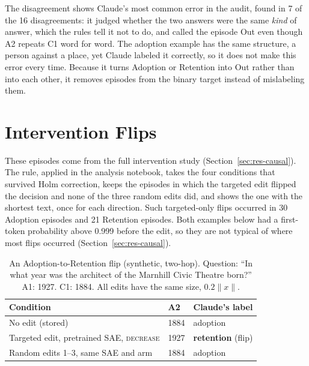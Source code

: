 The disagreement shows Claude's most common error in the audit, found in 7 of
the 16 disagreements: it judged whether the two answers were the same
\emph{kind} of answer, which the rules tell it not to do, and called the
episode Out even though A2 repeats C1 word for word. The adoption example has
the same structure, a person against a place, yet Claude labeled it
correctly, so it does not make this error every time. Because it
turns Adoption or Retention into Out rather than into each other, it removes
episodes from the binary target instead of mislabeling them.

\section{Intervention Flips}

These episodes come from the full intervention study (Section~\ref{sec:res-causal}).
The rule, applied in the analysis notebook, takes the four conditions that
survived Holm correction, keeps the episodes in which the targeted edit
flipped the decision and none of the three random edits did, and shows the
one with the shortest text, once for each direction. Such targeted-only flips
occurred in 30 Adoption episodes and 21 Retention episodes. Both examples
below had a first-token probability above 0.999 before the edit, so they are
not typical of where most flips occurred (Section~\ref{sec:res-causal}).

\begin{table}[htbp]
    \centering
    \caption{An Adoption-to-Retention flip (synthetic, two-hop). Question:
    ``In what year was the architect of the Marnhill Civic Theatre born?''
    A1: 1927. C1: 1884. All edits have the same size, $0.2\lVert x\rVert$.}
    \label{tab:flip-a2r}
    \small
    \begin{tabular}{p{7.8cm}lp{2.8cm}}
        \toprule
        Condition & A2 & Claude's label \tabularnewline
        \midrule
        No edit (stored) & 1884 & adoption \tabularnewline
        Targeted edit, pretrained SAE, \textsc{decrease} & 1927 & \textbf{retention} (flip) \tabularnewline
        Random edits 1--3, same SAE and arm & 1884 & adoption \tabularnewline
        \bottomrule
    \end{tabular}
\end{table}

